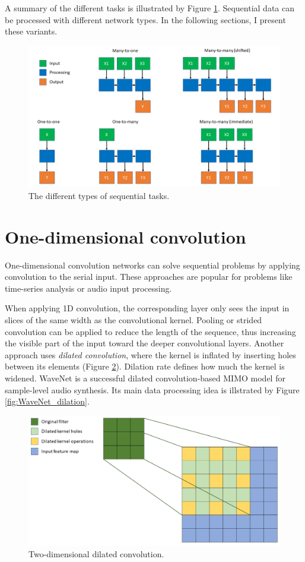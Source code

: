 A summary of the different tasks is illustrated by Figure \ref{fig:task_types}. Sequential data can be processed with different network types. In the following sections, I present these variants.

\begin{figure}[htb]
 \centerline{\includegraphics[width=1.0\columnwidth]{.//Figure/Sequential/task_types.png}}
 \caption{The different types of sequential tasks.}
 \label{fig:task_types}
\end{figure}

\section{One-dimensional convolution}

One-dimensional convolution networks can solve sequential problems by applying convolution to the serial input. These approaches are popular for problems like time-series analysis or audio input processing. 

When applying 1D convolution, the corresponding layer only sees the input in slices of the same width as the convolutional kernel. Pooling or strided convolution can be applied to reduce the length of the sequence, thus increasing the visible part of the input toward the deeper convolutional layers. Another approach uses \textit{dilated convolution}, where the kernel is inflated by inserting holes between its elements (Figure \ref{fig:dilated_convolution}). Dilation rate defines how much the kernel is widened. WaveNet\cite{WaveNet} is a successful dilated convolution-based MIMO model for sample-level audio synthesis. Its main data processing idea is illstrated by Figure \ref{fig:WaveNet_dilation}.

\begin{figure}[H]
 \centerline{\includegraphics[width=0.8\columnwidth]{.//Figure/Sequential/dilated_convolution.png}}
 \caption{Two-dimensional dilated convolution.}
 \label{fig:dilated_convolution}
\end{figure}


